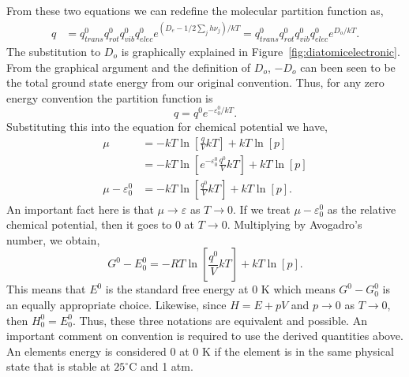 From these two equations we can redefine the molecular partition function as,
\begin{align*}
	q &= q_{trans}^0 q_{rot}^0 q_{vib}^0 q_{elec}^0 e^{(D_e - 1/2
		\sum_{j}{h\nu_{j}})/kT} = q_{trans}^0 q_{rot}^0 q_{vib}^0 q_{elec}^0
		e^{D_o /kT}.
\end{align*}
The substitution to $D_o$ is graphically explained in
Figure~\ref{fig:diatomicelectronic}. From the graphical argument and the
definition of $D_o$, $-D_{o}$ can been seen to be the total ground state energy
from our original convention. Thus, for any zero energy convention the partition
function is
\begin{equation*}
	q = q^0 e^{-\varepsilon_{0}^0 /kT}.
\end{equation*}
Substituting this into the equation for chemical potential we have,
\begin{align*}
	\mu &= -kT\ln{\left[\frac{q}{V} kT \right]} + kT\ln{[p]} \\
		&= -kT\ln{\left[e^{-\varepsilon^0_0}\frac{q^0}{V} kT \right]} +
		kT\ln{[p]} \\	
	\mu - \varepsilon^0_0 &= -kT\ln{\left[\frac{q^0}{V} kT \right]} +
	kT\ln{[p]}.
\end{align*}
An important fact here is that $\mu \to \varepsilon$ as $T \to 0$. If we treat
$\mu - \varepsilon^0_0$ as the relative chemical potential, then it goes to 0 at
$T \to 0$. Multiplying by Avogadro's number, we obtain,
\begin{equation*}
	G^0 - E^0_0 = -RT \ln{\left[\frac{q^0}{V} kT \right]} + kT\ln{[p]}.
\end{equation*}
This means that $E^0$ is the standard free energy at 0 K which means $G^0 -
G^0_0$ is an equally appropriate choice. Likewise, since $H = E + pV$ and $p \to
0$ as $T \to 0$, then $H^0_0 = E^0_0 $. Thus, these three notations are
equivalent and possible.  An important comment on convention is required to use
the derived quantities above. An elements energy is considered 0 at 0 K if the
element is in the same physical state that is stable at $25^{\circ}$C and 1 atm.
